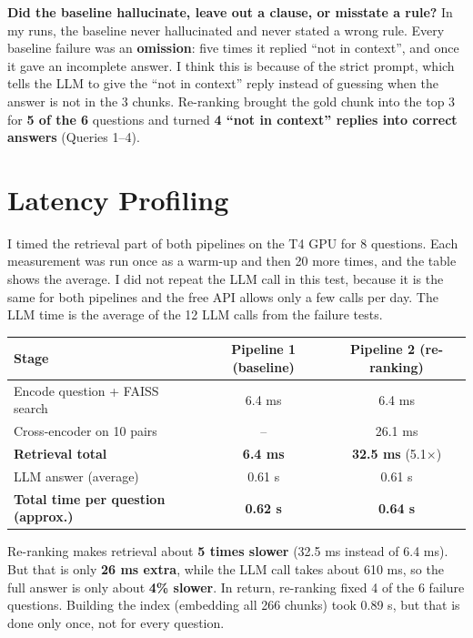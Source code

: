 \documentclass[11pt,a4paper]{article}
\begin{document}
\textbf{Did the baseline hallucinate, leave out a clause, or misstate a rule?} In my runs, the baseline never hallucinated and never stated a wrong rule. Every baseline failure was an \textbf{omission}: five times it replied ``not in context'', and once it gave an incomplete answer. I think this is because of the strict prompt, which tells the LLM to give the ``not in context'' reply instead of guessing when the answer is not in the 3 chunks. Re-ranking brought the gold chunk into the top 3 for \textbf{5 of the 6} questions and turned \textbf{4 ``not in context'' replies into correct answers} (Queries 1--4).

\section{Latency Profiling}

I timed the retrieval part of both pipelines on the T4 GPU for 8 questions. Each measurement was run once as a warm-up and then 20 more times, and the table shows the average. I did not repeat the LLM call in this test, because it is the same for both pipelines and the free API allows only a few calls per day. The LLM time is the average of the 12 LLM calls from the failure tests.

\begin{center}
\begin{tabular}{lcc}
\toprule
\textbf{Stage} & \textbf{Pipeline 1 (baseline)} & \textbf{Pipeline 2 (re-ranking)} \\
\midrule
Encode question + FAISS search & 6.4 ms & 6.4 ms \\
Cross-encoder on 10 pairs & -- & 26.1 ms \\
\textbf{Retrieval total} & \textbf{6.4 ms} & \textbf{32.5 ms} (5.1$\times$) \\
LLM answer (average) & 0.61 s & 0.61 s \\
\textbf{Total time per question (approx.)} & \textbf{0.62 s} & \textbf{0.64 s} \\
\bottomrule
\end{tabular}
\end{center}

Re-ranking makes retrieval about \textbf{5 times slower} (32.5 ms instead of 6.4 ms). But that is only \textbf{26 ms extra}, while the LLM call takes about 610 ms, so the full answer is only about \textbf{4\% slower}. In return, re-ranking fixed 4 of the 6 failure questions. Building the index (embedding all 266 chunks) took 0.89 s, but that is done only once, not for every question.
\end{document}
